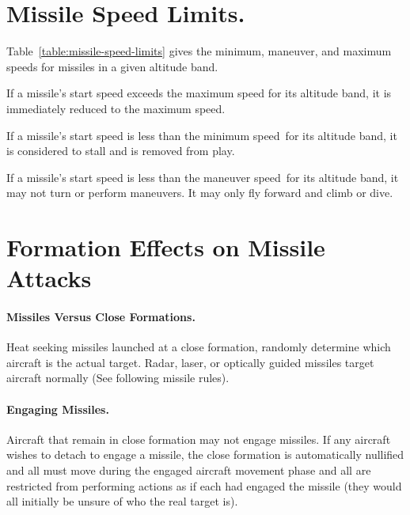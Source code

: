 \begin{advancedrules}
{}{
\section{Missile Speed Limits.} 

Table~\ref{table:missile-speed-limits} gives the minimum, maneuver, and maximum speeds for missiles in a given altitude band. 

If a missile's start speed exceeds the maximum speed for its altitude band, it is immediately reduced to the maximum speed.

If a missile's start speed is less than the minimum speed for its altitude band, it is considered to stall and is removed from play. 

If a missile's start speed is less than the maneuver speed for its altitude band, it may not turn or perform maneuvers. It may only fly forward and climb or dive.

}
\section{Formation Effects on Missile Attacks}

\paragraph{Missiles Versus Close Formations.} Heat seeking missiles launched at a close formation, randomly determine which aircraft is the actual target. Radar, laser, or optically guided missiles target aircraft normally (See following missile rules).

\paragraph{Engaging Missiles.} Aircraft that remain in close formation may not engage missiles. If any aircraft wishes to detach to engage a missile, the close formation is automatically nullified and all must move during the engaged aircraft movement phase and all are restricted from performing actions as if each had engaged the missile (they would all initially be unsure of who the real target is).

\end{advancedrules}
